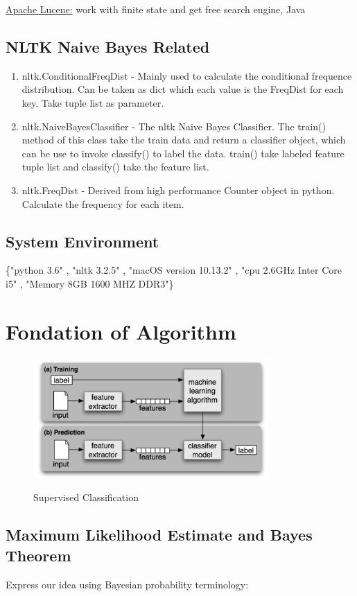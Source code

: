 \documentclass[a4paper]{article}
\begin{document}
\href{http://lucene.apache.org/}{Apache Lucene:} work with finite state and get free search engine, Java

\subsection{NLTK Naive Bayes Related}
\begin{enumerate}
\item nltk.ConditionalFreqDist - Mainly used to calculate the conditional frequence distribution. Can be taken as dict which each value is the FreqDist for each key. Take tuple list as parameter.
\item nltk.NaiveBayesClassifier - The nltk Naive Bayes Classifier. The train() method of this class take the train data and return a classifier object, which can be use to invoke classify() to label the data. train() take labeled feature tuple list and classify() take the feature list.
\item nltk.FreqDist - Derived from high performance Counter object in python. Calculate the frequency for each item.
\end{enumerate}
\subsection{System Environment}
\{"python 3.6"
, "nltk 3.2.5"
, "macOS version 10.13.2"
, "cpu 2.6GHz Inter Core i5"
, "Memory 8GB 1600 MHZ DDR3"\}

\section{Fondation of Algorithm}
\begin{figure}[H]  
\centering
\includegraphics[width=0.8\textwidth]{process_flow.png}
\caption{Supervised Classification\protect\footnotemark}  
\cite{bird_natural_2009}
\end{figure}

\subsection{Maximum Likelihood Estimate and Bayes Theorem}
Express our idea using Bayesian probability terminology:
\end{document}
